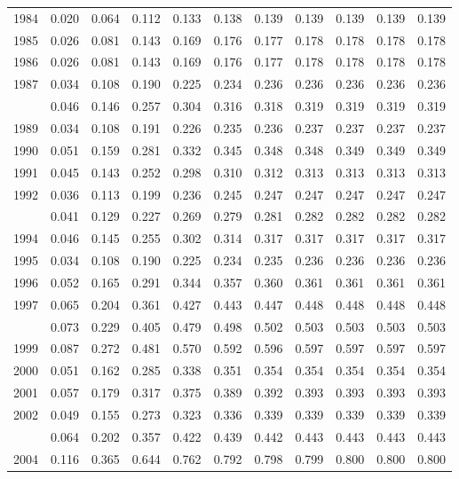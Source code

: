 \documentclass[
]{article}
\begin{document}
\begin{longtable}[t]{lrrrrrrrrrr}
1984 & 0.020 & 0.064 & 0.112 & 0.133 & 0.138 & 0.139 & 0.139 & 0.139 & 0.139 & 0.139\\
1985 & 0.026 & 0.081 & 0.143 & 0.169 & 0.176 & 0.177 & 0.178 & 0.178 & 0.178 & 0.178\\
1986 & 0.026 & 0.081 & 0.143 & 0.169 & 0.176 & 0.177 & 0.178 & 0.178 & 0.178 & 0.178\\
1987 & 0.034 & 0.108 & 0.190 & 0.225 & 0.234 & 0.236 & 0.236 & 0.236 & 0.236 & 0.236\\
\addlinespace
1988 & 0.046 & 0.146 & 0.257 & 0.304 & 0.316 & 0.318 & 0.319 & 0.319 & 0.319 & 0.319\\
1989 & 0.034 & 0.108 & 0.191 & 0.226 & 0.235 & 0.236 & 0.237 & 0.237 & 0.237 & 0.237\\
1990 & 0.051 & 0.159 & 0.281 & 0.332 & 0.345 & 0.348 & 0.348 & 0.349 & 0.349 & 0.349\\
1991 & 0.045 & 0.143 & 0.252 & 0.298 & 0.310 & 0.312 & 0.313 & 0.313 & 0.313 & 0.313\\
1992 & 0.036 & 0.113 & 0.199 & 0.236 & 0.245 & 0.247 & 0.247 & 0.247 & 0.247 & 0.247\\
\addlinespace
1993 & 0.041 & 0.129 & 0.227 & 0.269 & 0.279 & 0.281 & 0.282 & 0.282 & 0.282 & 0.282\\
1994 & 0.046 & 0.145 & 0.255 & 0.302 & 0.314 & 0.317 & 0.317 & 0.317 & 0.317 & 0.317\\
1995 & 0.034 & 0.108 & 0.190 & 0.225 & 0.234 & 0.235 & 0.236 & 0.236 & 0.236 & 0.236\\
1996 & 0.052 & 0.165 & 0.291 & 0.344 & 0.357 & 0.360 & 0.361 & 0.361 & 0.361 & 0.361\\
1997 & 0.065 & 0.204 & 0.361 & 0.427 & 0.443 & 0.447 & 0.448 & 0.448 & 0.448 & 0.448\\
\addlinespace
1998 & 0.073 & 0.229 & 0.405 & 0.479 & 0.498 & 0.502 & 0.503 & 0.503 & 0.503 & 0.503\\
1999 & 0.087 & 0.272 & 0.481 & 0.570 & 0.592 & 0.596 & 0.597 & 0.597 & 0.597 & 0.597\\
2000 & 0.051 & 0.162 & 0.285 & 0.338 & 0.351 & 0.354 & 0.354 & 0.354 & 0.354 & 0.354\\
2001 & 0.057 & 0.179 & 0.317 & 0.375 & 0.389 & 0.392 & 0.393 & 0.393 & 0.393 & 0.393\\
2002 & 0.049 & 0.155 & 0.273 & 0.323 & 0.336 & 0.339 & 0.339 & 0.339 & 0.339 & 0.339\\
\addlinespace
2003 & 0.064 & 0.202 & 0.357 & 0.422 & 0.439 & 0.442 & 0.443 & 0.443 & 0.443 & 0.443\\
2004 & 0.116 & 0.365 & 0.644 & 0.762 & 0.792 & 0.798 & 0.799 & 0.800 & 0.800 & 0.800\\

\end{longtable}
\end{document}
